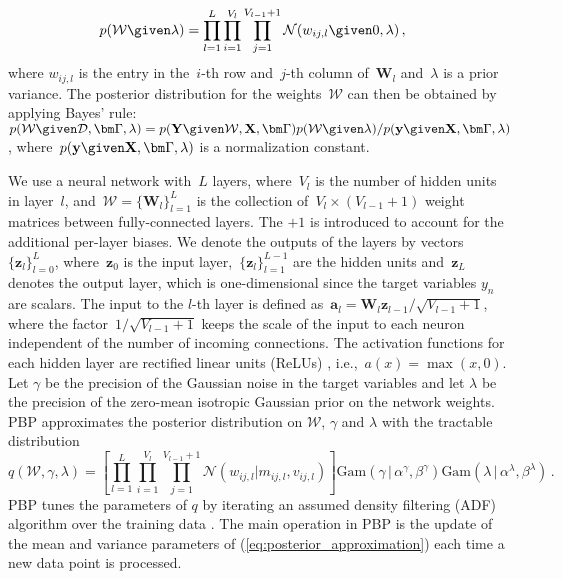 \vspace{-0.5cm}
{\small
\begin{align}
p(\mathcal{W}\given\lambda) &= \prod_{l=1}^L \prod_{i=1}^{V_l} \prod_{j=1}^{V_{l-1}+1} \mathcal{N}(w_{ij,l}\given0,\lambda)\,,\label{eq:prior}
\end{align}
}where $w_{ij,l}$ is the entry in the~$i$-th row and~$j$-th column
of~$\mathbf{W}_l$ and~$\lambda$ is a prior variance.  The posterior
distribution for the weights~$\mathcal{W}$ can then be obtained by
applying Bayes' rule:
$p(\mathcal{W}\given\mathcal{D},\bm\Gamma,\lambda) = p(\mathbf{Y}\given\mathcal{W},\mathbf{X},\bm \Gamma)p(\mathcal{W}\given\lambda)
/ p(\mathbf{y}\given\mathbf{X},\bm\Gamma,\lambda)$,
where~$p(\mathbf{y}\given\mathbf{X},\bm \Gamma, \lambda)$ is a normalization
constant.

We use a neural network with~$L$ layers, where~$V_l$ is the number of hidden units in layer~$l$, and~${\mathcal{W} = \{ \mathbf{W}_l \}_{l=1}^L}$ is the collection of~${V_l\times (V_{l-1}+1)}$ weight matrices between fully-connected layers. The $+1$ is introduced to account for the additional per-layer biases. We denote the outputs of the layers by vectors~$\{ \mathbf{z}_l \}_{l=0}^{L}$, where~$\mathbf{z}_0$ is the input layer,~${\{\mathbf{z}_l\}_{l=1}^{L-1}}$ are the hidden units and~$\mathbf{z}_L$ denotes the output layer, which is one-dimensional since the target variables $y_n$ are scalars.   
The input to the $l$-th layer is defined as~${\mathbf{a}_l = \mathbf{W}_l \mathbf{z}_{l-1} / \sqrt{V_{l-1}+1} }$,
where the factor~${1/\sqrt{V_{l-1} + 1}}$ keeps the scale of the input to each neuron independent
of the number of incoming connections.
The activation functions for each hidden layer are rectified linear units (ReLUs)
\cite{nair2010rectified}, i.e.,~${a(x) = \max(x,0)}$.
Let $\gamma$ be the precision of the Gaussian noise in the target variables and let $\lambda$
be the precision of the zero-mean isotropic Gaussian prior on the network weights.
PBP approximates the posterior distribution on $\mathcal{W}$, $\gamma$ and $\lambda$ with
the tractable distribution
\begin{equation}
q(\mathcal{W},\gamma, \lambda) = \left[ \prod_{l=1}^L\! \prod_{i=1}^{V_l}\! 
\prod_{j=1}^{V_{l\!-\!1}\!+\!1} \mathcal{N}(w_{ij,l}| m_{ij,l},v_{ij,l})\right ]
 \text{Gam}(\gamma \,|\, \alpha^\gamma, \beta^\gamma)
\text{Gam}(\lambda \,|\, \alpha^\lambda, \beta^\lambda)\,.\label{eq:posterior_approximation}
\end{equation}
PBP tunes the parameters of $q$ by iterating an assumed
density filtering (ADF) algorithm over the training data \cite{opper1998bayesian}. The main operation in PBP
is the update of the mean and variance parameters of (\ref{eq:posterior_approximation})
each time a new data point is processed. 

